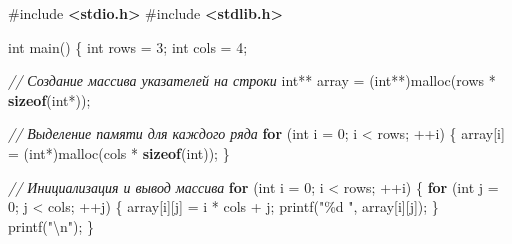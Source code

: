 \documentclass[
]{article}
\newenvironment{Shaded}{}{}
\newcommand{\CommentTok}[1]{\textcolor[rgb]{0.38,0.63,0.69}{\textit{#1}}}
\newcommand{\ControlFlowTok}[1]{\textcolor[rgb]{0.00,0.44,0.13}{\textbf{#1}}}
\newcommand{\DataTypeTok}[1]{\textcolor[rgb]{0.56,0.13,0.00}{#1}}
\newcommand{\DecValTok}[1]{\textcolor[rgb]{0.25,0.63,0.44}{#1}}
\newcommand{\ImportTok}[1]{\textcolor[rgb]{0.00,0.50,0.00}{\textbf{#1}}}
\newcommand{\KeywordTok}[1]{\textcolor[rgb]{0.00,0.44,0.13}{\textbf{#1}}}
\newcommand{\NormalTok}[1]{#1}
\newcommand{\OperatorTok}[1]{\textcolor[rgb]{0.40,0.40,0.40}{#1}}
\newcommand{\PreprocessorTok}[1]{\textcolor[rgb]{0.74,0.48,0.00}{#1}}
\newcommand{\SpecialCharTok}[1]{\textcolor[rgb]{0.25,0.44,0.63}{#1}}
\newcommand{\StringTok}[1]{\textcolor[rgb]{0.25,0.44,0.63}{#1}}
\begin{document}
\begin{Shaded}
\begin{Highlighting}[]
\PreprocessorTok{\#include }\ImportTok{\textless{}stdio.h\textgreater{}}
\PreprocessorTok{\#include }\ImportTok{\textless{}stdlib.h\textgreater{}}

\DataTypeTok{int}\NormalTok{ main}\OperatorTok{()} \OperatorTok{\{}
    \DataTypeTok{int}\NormalTok{ rows }\OperatorTok{=} \DecValTok{3}\OperatorTok{;}
    \DataTypeTok{int}\NormalTok{ cols }\OperatorTok{=} \DecValTok{4}\OperatorTok{;}

    \CommentTok{// Создание массива указателей на строки}
    \DataTypeTok{int}\OperatorTok{**}\NormalTok{ array }\OperatorTok{=} \OperatorTok{(}\DataTypeTok{int}\OperatorTok{**)}\NormalTok{malloc}\OperatorTok{(}\NormalTok{rows }\OperatorTok{*} \KeywordTok{sizeof}\OperatorTok{(}\DataTypeTok{int}\OperatorTok{*));}

    \CommentTok{// Выделение памяти для каждого ряда}
    \ControlFlowTok{for} \OperatorTok{(}\DataTypeTok{int}\NormalTok{ i }\OperatorTok{=} \DecValTok{0}\OperatorTok{;}\NormalTok{ i }\OperatorTok{\textless{}}\NormalTok{ rows}\OperatorTok{;} \OperatorTok{++}\NormalTok{i}\OperatorTok{)} \OperatorTok{\{}
\NormalTok{        array}\OperatorTok{[}\NormalTok{i}\OperatorTok{]} \OperatorTok{=} \OperatorTok{(}\DataTypeTok{int}\OperatorTok{*)}\NormalTok{malloc}\OperatorTok{(}\NormalTok{cols }\OperatorTok{*} \KeywordTok{sizeof}\OperatorTok{(}\DataTypeTok{int}\OperatorTok{));}
    \OperatorTok{\}}

    \CommentTok{// Инициализация и вывод массива}
    \ControlFlowTok{for} \OperatorTok{(}\DataTypeTok{int}\NormalTok{ i }\OperatorTok{=} \DecValTok{0}\OperatorTok{;}\NormalTok{ i }\OperatorTok{\textless{}}\NormalTok{ rows}\OperatorTok{;} \OperatorTok{++}\NormalTok{i}\OperatorTok{)} \OperatorTok{\{}
        \ControlFlowTok{for} \OperatorTok{(}\DataTypeTok{int}\NormalTok{ j }\OperatorTok{=} \DecValTok{0}\OperatorTok{;}\NormalTok{ j }\OperatorTok{\textless{}}\NormalTok{ cols}\OperatorTok{;} \OperatorTok{++}\NormalTok{j}\OperatorTok{)} \OperatorTok{\{}
\NormalTok{            array}\OperatorTok{[}\NormalTok{i}\OperatorTok{][}\NormalTok{j}\OperatorTok{]} \OperatorTok{=}\NormalTok{ i }\OperatorTok{*}\NormalTok{ cols }\OperatorTok{+}\NormalTok{ j}\OperatorTok{;}
\NormalTok{            printf}\OperatorTok{(}\StringTok{"}\SpecialCharTok{\%d}\StringTok{ "}\OperatorTok{,}\NormalTok{ array}\OperatorTok{[}\NormalTok{i}\OperatorTok{][}\NormalTok{j}\OperatorTok{]);}
        \OperatorTok{\}}
\NormalTok{        printf}\OperatorTok{(}\StringTok{"}\SpecialCharTok{\textbackslash{}n}\StringTok{"}\OperatorTok{);}
    \OperatorTok{\}}


\end{Highlighting}
\end{Shaded}
\end{document}
